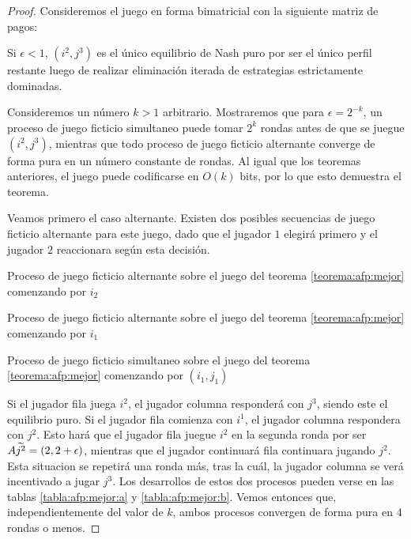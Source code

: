 \begin{proof}
    Consideremos el juego en forma bimatricial con la siguiente matriz de pagos:

    

    Si $\epsilon < 1$, $(i^2, j^3)$ es el único equilibrio de Nash puro por ser el único perfil restante luego de realizar eliminación iterada de estrategias estrictamente dominadas.

    Consideremos un número $k > 1$ arbitrario. Mostraremos que para $\epsilon = 2^{-k}$, un proceso de juego ficticio simultaneo puede tomar $2^k$ rondas antes de que se juegue $(i^2, j^3)$, mientras que todo proceso de juego ficticio alternante converge de forma pura en un número constante de rondas. Al igual que los teoremas anteriores, el juego puede codificarse en $O(k)$ bits, por lo que esto demuestra el teorema.

    Veamos primero el caso alternante. Existen dos posibles secuencias de juego ficticio alternante para este juego, dado que el jugador $1$ elegirá primero y el jugador $2$ reaccionara según esta decisión.

    \begin{table}
        \centering
        
        \caption{Proceso de juego ficticio alternante sobre el juego del teorema \ref{teorema:afp:mejor} comenzando por $i_2$}
        \label{tabla:afp:mejor:b}
        \centering
        
        \caption{Proceso de juego ficticio alternante sobre el juego del teorema \ref{teorema:afp:mejor} comenzando por $i_1$}
        \label{tabla:afp:mejor:a}
        \centering
        
        \caption{Proceso de juego ficticio simultaneo sobre el juego del teorema \ref{teorema:afp:mejor} comenzando por $(i_1, j_1)$}
        \label{tabla:afp:mejor:c}
    \end{table}

    Si el jugador fila juega $i^2$, el jugador columna responderá con $j^3$, siendo este el equilibrio puro. Si el jugador fila comienza con $i^1$, el jugador columna respondera con $j^2$. Esto hará que el jugador fila juegue $i^2$ en la segunda ronda por ser $A\widetilde{j^2} = (2, 2 + \epsilon)$, mientras que el jugador continuará fila continuara jugando $j^2$. Esta situacion se repetirá una ronda más, tras la cuál, la jugador columna se verá incentivado a jugar $j^3$. Los desarrollos de estos dos procesos pueden verse en las tablas \ref{tabla:afp:mejor:a} y \ref{tabla:afp:mejor:b}. Vemos entonces que, independientemente del valor de $k$, ambos procesos convergen de forma pura en 4 rondas o menos.


\end{proof}
